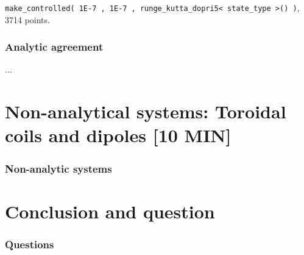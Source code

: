 \documentclass{beamer}
\begin{document}
\begin{frame}
\begin{center}
{\lstinline{make_controlled( 1E-7 , 1E-7 , runge_kutta_dopri5< state_type >() )},  3714 points.
}%
%
\end{center}
\end{frame}

\begin{frame}
\frametitle{Analytic agreement}
...
\end{frame}


\section{Non-analytical systems: Toroidal coils and dipoles [10 MIN]}

\begin{frame}
\frametitle{Non-analytic systems}
\end{frame}

\section{Conclusion and question}

\begin{frame}
\frametitle{Questions}
\end{frame}


\end{document}
